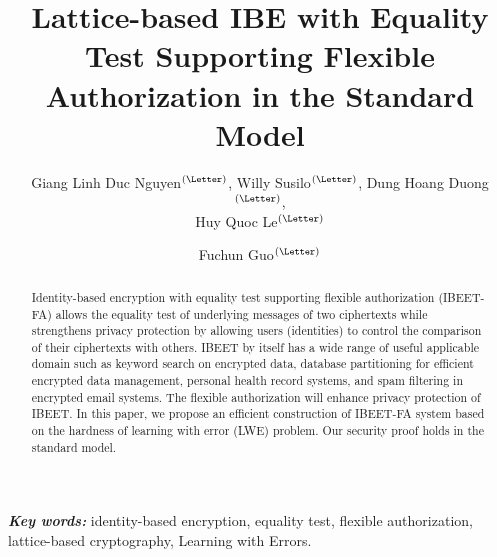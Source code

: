 \documentclass[runningheads,10pt]{llncs}
\providecommand{\keywords}[1]{\textbf{\textit{Key words: }} #1}
\begin{document}
	
\title{Lattice-based IBE with Equality Test Supporting Flexible Authorization in the Standard Model}

\author{Giang Linh Duc Nguyen$^\textrm{(\Letter)}$, Willy Susilo$^\textrm{(\Letter)}$, Dung Hoang Duong$^\textrm{(\Letter)}$, \\Huy Quoc Le$^\textrm{(\Letter)}$ \and Fuchun Guo$^\textrm{(\Letter)}$}
\maketitle


\begin{abstract}
	Identity-based encryption with equality test supporting flexible authorization (IBEET-FA) allows the equality test of underlying messages of two ciphertexts while strengthens privacy protection by allowing users (identities) to control the comparison of their ciphertexts with others. IBEET by itself has a wide range of useful applicable domain such as keyword search on encrypted data, database partitioning for efficient encrypted data management, personal health record systems, and spam filtering in encrypted email systems. The flexible authorization will enhance privacy protection of IBEET. In this paper, we propose an efficient construction of IBEET-FA system based on the hardness of learning with error (LWE) problem. Our security proof holds in the standard model.
\end{abstract}

\keywords{identity-based encryption, equality test, flexible authorization, lattice-based cryptography,  Learning with Errors.}

\end{document}
